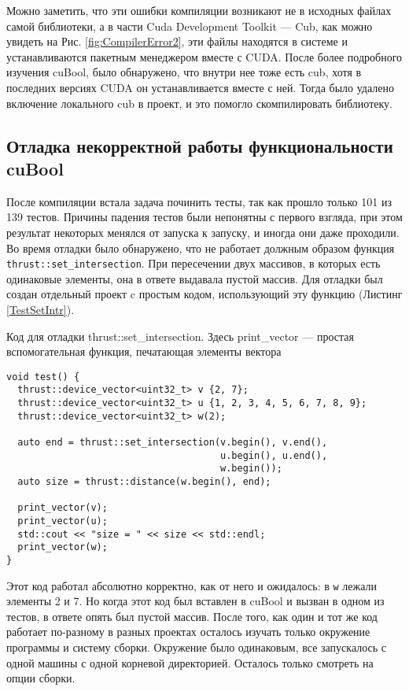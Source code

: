 Можно заметить, что эти ошибки компиляции возникают не в исходных файлах самой библиотеки, а в части Cuda Development Toolkit --- Cub, как можно увидеть на Рис. \ref{fig:CompilerError2}, эти файлы находятся в системе и устанавливаются пакетным менеджером вместе с CUDA. После более подробного изучения cuBool, было обнаружено, что внутри нее тоже есть cub, хотя в последних версиях CUDA он устанавливается вместе с ней. Тогда было удалено включение локального cub в проект, и это помогло скомпилировать библиотеку.

\subsection{Отладка некорректной работы функциональности cuBool}

После компиляции встала задача починить тесты, так как прошло только 101 из 139 тестов. Причины падения тестов были непонятны с первого взгляда,
при этом результат некоторых менялся от запуска к запуску, и иногда они даже проходили.
Во время отладки было обнаружено, что не работает должным образом функция \verb|thrust::set_intersection|.
При пересечении двух массивов, в которых есть одинаковые элементы, она в ответе выдавала пустой массив. Для отладки был создан отдельный проект c простым кодом, использующий эту функцию (Листинг \ref{TestSetIntr}).

\begin{listing}
    \caption{Код для отладки thrust::set\_intersection. Здесь print\_vector --- простая вспомогательная функция, печатающая элементы вектора}
    \begin{verbatim}
void test() {
  thrust::device_vector<uint32_t> v {2, 7};
  thrust::device_vector<uint32_t> u {1, 2, 3, 4, 5, 6, 7, 8, 9};
  thrust::device_vector<uint32_t> w(2);

  auto end = thrust::set_intersection(v.begin(), v.end(),
                                      u.begin(), u.end(),
                                      w.begin());
  auto size = thrust::distance(w.begin(), end);

  print_vector(v);
  print_vector(u);
  std::cout << "size = " << size << std::endl;
  print_vector(w);
}
  \end{verbatim}
\label{TestSetIntr}    
\end{listing}

Этот код работал абсолютно корректно, как от него и ожидалось: в \verb|w| лежали элементы 2 и 7.
Но когда этот код был вставлен в cuBool и вызван в одном из тестов, в ответе опять был пустой массив. После того, как один и тот же код работает по-разному в разных проектах осталось изучать только окружение программы и систему сборки. Окружение было одинаковым, все запускалось с одной машины с одной корневой директорией. Осталось только смотреть на опции сборки.

